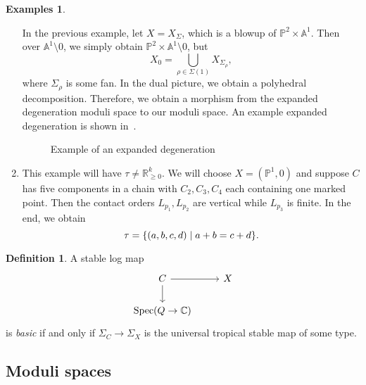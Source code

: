 \documentclass[leqno, openany]{memoir}
\theoremstyle{definition}
\newtheorem{defn}[thm]{Definition}
\newtheorem{exms}[thm]{Examples}
\theoremstyle{remark}
\theoremstyle{plain}
\theoremstyle{definition}
\theoremstyle{remark}
\newcommand{\A}{\mathbb{A}}
\newcommand{\R}{\mathbb{R}}
\newcommand{\C}{\mathbb{C}}
\renewcommand{\P}{\mathbb{P}}
\DeclareMathOperator{\Spec}{Spec}
\begin{document}
\begin{exms}
\begin{enumerate}
In the previous example, let $X = X_{\Sigma}$, which is a blowup of $\P^2 \times \A^1$. Then over $\A^1 \setminus \qty{0}$, we simply obtain $\P^2 \times \A^1 \setminus \qty{0}$, but
\[ X_0 = \bigcup_{\rho \in \Sigma(1)} X_{\Sigma_{\rho}}, \]
where $\Sigma_{\rho}$ is some fan. In the dual picture, we obtain a polyhedral decomposition. Therefore, we obtain a morphism from the expanded degeneration moduli space to our moduli space. An example expanded degeneration is shown in~.
\begin{figure}[h]
  \centering
  \caption{Example of an expanded degeneration}
  \label{fig:expanded}
\end{figure}

\item This example will have $\tau \neq \R_{\geq 0}^k$. We will choose $X = (\P^1, 0)$ and suppose $C$ has five components in a chain with $C_2, C_3, C_4$ each containing one marked point. Then the contact orders $L_{p_1}, L_{p_2}$ are vertical while $L_{p_3}$ is finite. In the end, we obtain
\[ \tau = \qty{(a,b,c,d) \mid a+b=c+d}. \]
\end{enumerate}
\end{exms}


\begin{defn}
  A stable log map
  \begin{equation*}
    \begin{tikzcd}
      C \ar{d} \ar{r} & X \\
      \Spec (Q \to \C)
    \end{tikzcd}
  \end{equation*}
  is \textit{basic} if and only if $\Sigma_C \to \Sigma_X$ is the universal tropical stable map of some type.
\end{defn}

\subsection{Moduli spaces}
\label{subsec:moduli}
\end{document}

